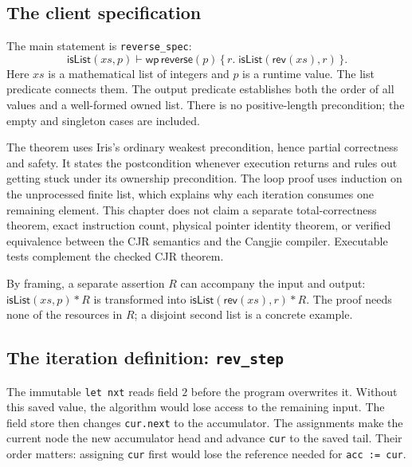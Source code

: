 \documentclass[11pt]{article}
\newcommand{\sep}{\mathbin{*}}
\newcommand{\Wpre}{\mathsf{wp}}
\begin{document}
\subsection{The client specification}

The main statement is \texttt{reverse\_spec}:
\[
\mathsf{isList}(xs,p)\vdash
 \Wpre\,\mathsf{reverse}(p)
 \,\{\,r.\;\mathsf{isList}(\mathsf{rev}(xs),r)\,\}.
\]
Here \(xs\) is a mathematical list of integers and \(p\) is a runtime value.
The list predicate connects them. The output predicate establishes both the
order of all values and a well-formed owned list. There is no positive-length
precondition; the empty and singleton cases are included.

The theorem uses Iris's ordinary weakest precondition, hence partial
correctness and safety. It states the postcondition whenever execution returns
and rules out getting stuck under its ownership precondition. The loop proof
uses induction on the unprocessed finite list, which explains why each
iteration consumes one remaining element. This chapter does not claim a
separate total-correctness theorem, exact instruction count, physical pointer
identity theorem, or verified equivalence between the CJR semantics and the
Cangjie compiler. Executable tests complement the checked CJR theorem.

By framing, a separate assertion \(R\) can accompany the input and output:
\(\mathsf{isList}(xs,p)\sep R\) is transformed into
\(\mathsf{isList}(\mathsf{rev}(xs),r)\sep R\). The proof needs none of the
resources in \(R\); a disjoint second list is a concrete example.

\subsection{The iteration definition: \texttt{rev\_step}}

\begin{minipage}{\linewidth}

\end{minipage}

The immutable \texttt{let nxt} reads field \(2\) before the program overwrites
it. Without this saved value, the algorithm would lose access to the remaining
input. The field store then changes \texttt{cur.next} to the accumulator.
The assignments make the current node the new accumulator head and advance
\texttt{cur} to the saved tail. Their order matters: assigning \texttt{cur}
first would lose the reference needed for \texttt{acc := cur}.
\end{document}
